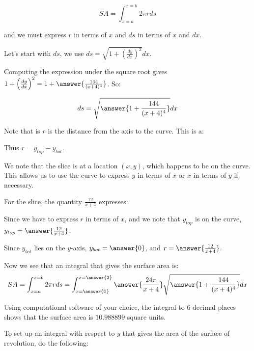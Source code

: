 \documentclass{ximera}
\begin{document}
\begin{exercise}
\[ SA = \int_{x=a}^{x=b} 2 \pi r ds\]

and we must express $r$ in terms of $x$ and $ds$ in terms of $x$ and $dx$.  


Let's start with $ds$, we use $ds = \sqrt{1+\left(\frac{dy}{dx}\right)^2} dx$.

Computing the expression under the square root gives $1+\left(\frac{dy}{dx}\right)^2 = 1+\answer{\frac{144}{(x+4)^4}}$.  So: 

\[
ds = \sqrt{\answer{1+\frac{144}{(x+4)^4}}} dx
\]


\begin{exercise}
Note that is $r$ is the distance from the axis to the curve. This is a:

\begin{multipleChoice}
\end{multipleChoice} 
Thus $r=y_{top}-y_{bot}$.  

We note that the slice is at a location $(x,y)$, which happens to be on the curve.  This allows us to use the curve to express $y$ in terms of $x$ or $x$ in terms of $y$ if necessary.  

For the slice, the quantity $\frac{12}{x+4}$ expresses:
\begin{multipleChoice}
\end{multipleChoice} 

Since we have to express $r$ in terms of $x$, and we note that $y_{top}$ is on the curve, $y_{top} = \answer{\frac{12}{x+4}}$.

Since $y_{bot}$ lies on the $y$-axis, $y_{bot} = \answer{0}$, and $r= \answer{\frac{12}{x+4}}$.

\end{exercise}

\begin{exercise}
Now we see that an integral that gives the surface area is: 
\[
SA= \int_{x=a}^{x=b} 2 \pi r ds = \int_{x=\answer{0}}^{x=\answer{2}} \answer{\frac{24\pi}{x+4}} \sqrt{\answer{1+\frac{144}{(x+4)^4}}} dx
\]

Using computational software of your choice, the integral to 6 decimal places shows that the surface area is $10.988899$ square units. 
\end{exercise}


To set up an integral with respect to $y$ that gives the area of the surface of revolution, do the following:  


\end{exercise}
\end{document}
